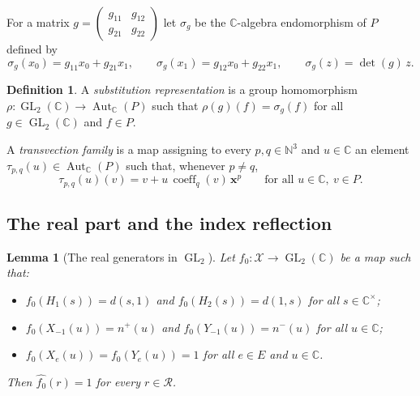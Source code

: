 \documentclass[11pt]{article}
\newtheorem{lemma}[theorem]{Lemma}
\theoremstyle{definition}
\newtheorem{definition}[theorem]{Definition}
\theoremstyle{remark}
\newcommand{\CC}{\mathbb{C}}
\newcommand{\NN}{\mathbb{N}}
\DeclareMathOperator{\GL}{GL}
\DeclareMathOperator{\Aut}{Aut}
\DeclareMathOperator{\coeff}{coeff}
\begin{document}
For a matrix $g=\begin{pmatrix}g_{11}&g_{12}\\g_{21}&g_{22}\end{pmatrix}$ let $\sigma_g$ be the $\CC$-algebra endomorphism of $P$ defined by
\[
\sigma_g(x_0)=g_{11}x_0+g_{21}x_1,\qquad \sigma_g(x_1)=g_{12}x_0+g_{22}x_1,\qquad \sigma_g(z)=\det(g)\,z .
\]

\begin{definition}
A \emph{substitution representation} is a group homomorphism $\rho\colon\GL_2(\CC)\to\Aut_\CC(P)$ such that $\rho(g)(f)=\sigma_g(f)$ for all $g\in\GL_2(\CC)$ and $f\in P$.

A \emph{transvection family} is a map assigning to every $p,q\in\NN^3$ and $u\in\CC$ an element $\tau_{p,q}(u)\in\Aut_\CC(P)$ such that, whenever $p\neq q$,
\[
\tau_{p,q}(u)(v)=v+u\,\coeff_q(v)\,\mathbf x^p\qquad\text{for all } u\in\CC,\ v\in P .
\]
\end{definition}

\subsection{The real part and the index reflection}

\begin{lemma}[The real generators in $\GL_2$]\label{lem:gm_gl2_rel}
Let $f_0\colon\mathcal X\to\GL_2(\CC)$ be a map such that:
\begin{itemize}
\item $f_0(H_1(s))=d(s,1)$ and $f_0(H_2(s))=d(1,s)$ for all $s\in\CC^\times$;
\item $f_0(X_{-1}(u))=n^+(u)$ and $f_0(Y_{-1}(u))=n^-(u)$ for all $u\in\CC$;
\item $f_0(X_e(u))=f_0(Y_e(u))=1$ for all $e\in E$ and $u\in\CC$.
\end{itemize}
Then $\widehat{f_0}(r)=1$ for every $r\in\mathcal R$.
\end{lemma}
\end{document}

